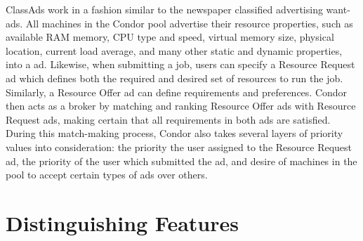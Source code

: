 ClassAds work in a fashion similar to the newspaper classified
advertising want-ads. All machines in the Condor pool advertise their
resource properties, such as available RAM memory, CPU type and speed,
virtual memory size, physical location, current load average, and many
other static and dynamic properties, into a  ad. Likewise,
when submitting a job, users can specify a Resource Request ad which
defines both the required and desired set of resources to run the job.
Similarly, a Resource Offer ad can define requirements and preferences.
Condor then acts as a broker by matching and ranking Resource
Offer ads with Resource Request ads, making certain that all
requirements in both ads are satisfied. During this match-making
process, Condor also takes several layers of priority values into
consideration: the priority the user assigned to the Resource Request
ad, the priority of the user which submitted the ad, and desire of
machines in the pool to accept certain types of ads over others. 

\section{Distinguishing Features}

